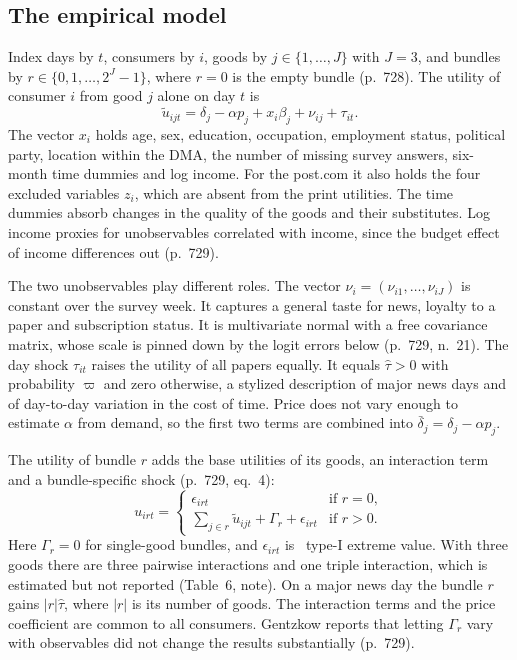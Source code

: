 \subsection{The empirical model}\label{sec:10-gentzkow-structural}

Index days by $t$, consumers by $i$, goods by $j \in \{1, \dots, J\}$ with $J = 3$, and bundles by $r \in \{0, 1, \dots,
2^J - 1\}$, where $r = 0$ is the empty bundle (p.~728). The utility of consumer $i$ from good $j$ alone on day $t$ is
\begin{equation}\label{eq:10-gentzkow-base}
  \tilde u_{ijt} = \delta_j - \alpha p_j + x_i\beta_j + \nu_{ij} + \tau_{it} .
\end{equation}
The vector $x_i$ holds age, sex, education, occupation, employment status, political party, location within the DMA,
the number of missing survey answers, six-month time dummies and log income. For the post.com it also holds the four
excluded variables $z_i$, which are absent from the print utilities. The time dummies absorb changes in the quality of
the goods and their substitutes. Log income proxies for unobservables correlated with income, since the budget effect
of income differences out (p.~729).

The two unobservables play different roles. The vector $\nu_i = (\nu_{i1}, \dots, \nu_{iJ})$ is constant over the
survey week. It captures a general taste for news, loyalty to a paper and subscription status. It is multivariate
normal with a free covariance matrix, whose scale is pinned down by the logit errors below (p.~729, n.~21). The day
shock $\tau_{it}$ raises the utility of all papers equally. It equals $\hat\tau > 0$ with probability $\varpi$ and zero
otherwise, a stylized description of major news days and of day-to-day variation in the cost of time. Price does not
vary enough to estimate $\alpha$ from demand, so the first two terms are combined into $\bar\delta_j = \delta_j - \alpha
p_j$.

The utility of bundle $r$ adds the base utilities of its goods, an interaction term and a bundle-specific shock
(p.~729, eq.~4):
\begin{equation}\label{eq:10-gentzkow-bundle}
  u_{irt} = \begin{cases}
    \epsilon_{irt} & \text{if } r = 0, \\
    \sum_{j \in r}\tilde u_{ijt} + \Gamma_r + \epsilon_{irt} & \text{if } r > 0.
  \end{cases}
\end{equation}
Here $\Gamma_r = 0$ for single-good bundles, and $\epsilon_{irt}$ is \iid\ type-I extreme value. With three goods there
are three pairwise interactions and one triple interaction, which is estimated but not reported (Table~6, note). On a
major news day the bundle $r$ gains $|r|\hat\tau$, where $|r|$ is its number of goods. The interaction terms and the
price coefficient are common to all consumers. Gentzkow reports that letting $\Gamma_r$ vary with observables did not
change the results substantially (p.~729).

